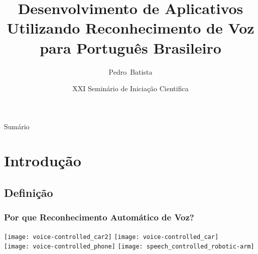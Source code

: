\documentclass{beamer}
\title[Reconhecimento de Voz para Português Brasileiro] %
{Desenvolvimento de Aplicativos Utilizando Reconhecimento de Voz para Português Brasileiro}
\author%
{Pedro~Batista}%
\institute %
{
   Laboratório de Processamento de Sinais \\
      Universidade Federal do Pará \\
      http://www.laps.ufpa.br%
}
\date[21 de Outubro de 2010] %
{XXI Seminário de Iniciação Cientifica}
\begin{document}
\begin{frame}
\titlepage
\end{frame}

\begin{frame}{Sumário}

\footnotesize
\tableofcontents
\end{frame}



   \section{Introdução}
   \subsection{Definição}

\begin{frame}
   \frametitle{Por que Reconhecimento Automático de Voz?}
   \vspace{0.5cm}
   \texttt{[image: voice-controlled\_car2]}
   \hspace{1cm}
   \texttt{[image: voice-controlled\_car]}\\

   \texttt{[image: voice-controlled\_phone]}
   \texttt{[image: speech\_controlled\_robotic-arm]}
\end{frame}
\end{document}
